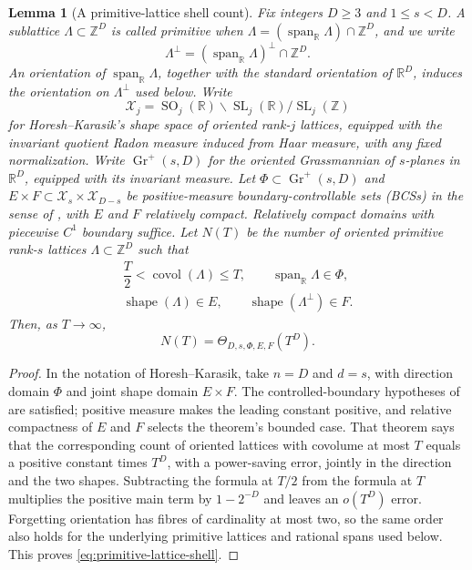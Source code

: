 \documentclass[11pt,reqno]{amsart}
\newtheorem{lemma}[theorem]{Lemma}
\theoremstyle{definition}
\theoremstyle{remark}
\begin{document}
\begin{lemma}[A primitive-lattice shell count]
\label{lem:primitive-lattice-shell}
Fix integers $D\geq3$ and $1\leq s<D$.  A sublattice
$\Lambda\subset\mathbb Z^D$ is called primitive when
$\Lambda=(\operatorname{span}_{\mathbb R}\Lambda)\cap\mathbb Z^D$, and we
write
\[
 \Lambda^\perp=
 (\operatorname{span}_{\mathbb R}\Lambda)^\perp\cap\mathbb Z^D.
\]
An orientation of $\operatorname{span}_{\mathbb R}\Lambda$, together with
the standard orientation of $\mathbb R^D$, induces the orientation on
$\Lambda^\perp$ used below.
Write
\[
 \mathcal X_j=\operatorname{SO}_j(\mathbb R)\backslash
 \operatorname{SL}_j(\mathbb R)/\operatorname{SL}_j(\mathbb Z)
\]
for Horesh--Karasik's shape space of oriented rank-$j$ lattices, equipped
with the invariant quotient Radon measure induced from Haar measure, with any
fixed normalization.  Write $\operatorname{Gr}^+(s,D)$ for the oriented
Grassmannian of $s$-planes in $\mathbb R^D$, equipped with its invariant
measure.  Let $\Phi\subset\operatorname{Gr}^+(s,D)$ and
$E\times F\subset\mathcal X_s\times\mathcal X_{D-s}$ be positive-measure
boundary-controllable sets (BCSs) in the sense of
\cite[Definition~3.1]{HoreshKarasik2023}, with $E$ and $F$ relatively
compact.  Relatively compact domains with piecewise $C^1$ boundary suffice.
Let $N(T)$ be the number of oriented primitive rank-$s$ lattices
$\Lambda\subset\mathbb Z^D$ such that
\[
 \begin{gathered}
  \dfrac{T}{2}<\operatorname{covol}(\Lambda)\leq T,\qquad
  \operatorname{span}_{\mathbb R}\Lambda\in\Phi,\\
  \operatorname{shape}(\Lambda)\in E,\qquad
  \operatorname{shape}(\Lambda^\perp)\in F.
 \end{gathered}
\]
Then, as $T\to\infty$,
\begin{equation}\label{eq:primitive-lattice-shell}
 N(T)=\Theta_{D,s,\Phi,E,F}(T^D).
\end{equation}
\end{lemma}

\begin{proof}
In the notation of Horesh--Karasik, take $n=D$ and $d=s$, with direction
domain $\Phi$ and joint shape domain $E\times F$.  The controlled-boundary
hypotheses of \cite[Theorem~1.1]{HoreshKarasik2023} are satisfied; positive
measure makes the leading constant positive, and relative compactness of $E$
and $F$ selects the theorem's bounded case.  That theorem says that the
corresponding count of oriented lattices with covolume at most $T$ equals a
positive constant times $T^D$, with a power-saving error, jointly in the
direction and the two shapes.  Subtracting the formula at $T/2$
from the formula at $T$ multiplies the positive main term by $1-2^{-D}$
and leaves an $o(T^D)$ error.  Forgetting orientation has fibres of
cardinality at most two, so the same order also holds for the underlying
primitive lattices and rational spans used below.  This proves
\eqref{eq:primitive-lattice-shell}.
\end{proof}
\end{document}
